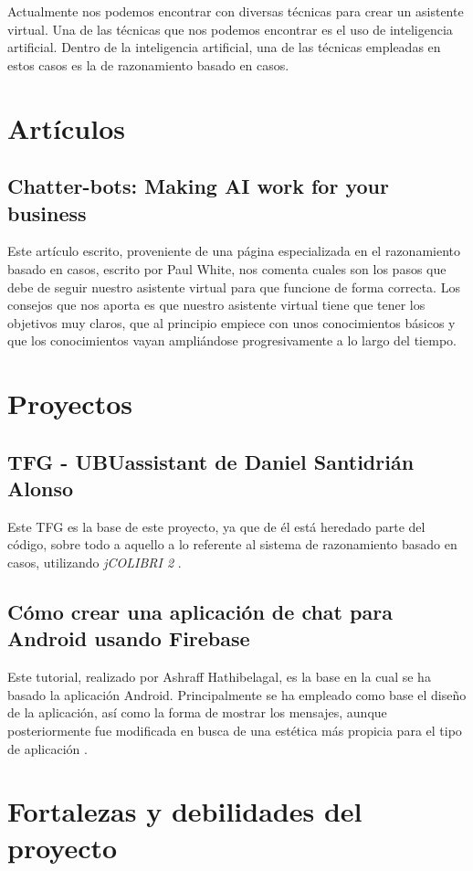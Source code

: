 
Actualmente nos podemos encontrar con diversas técnicas para crear un asistente virtual. Una de las técnicas que nos podemos encontrar es el uso de inteligencia artificial. Dentro de la inteligencia artificial, una de las técnicas empleadas en estos casos es la de razonamiento basado en casos.

\section{Artículos}
\subsection{Chatter-bots: Making AI work for your business}
Este artículo escrito, proveniente de una página especializada en el razonamiento basado en casos, escrito por Paul White, nos comenta cuales son los pasos que debe de seguir nuestro asistente virtual para que funcione de forma correcta. Los consejos que nos aporta es que nuestro asistente virtual tiene que tener los objetivos muy claros, que al principio empiece con unos conocimientos básicos y que los conocimientos vayan ampliándose progresivamente a lo largo del tiempo.

\section{Proyectos}
\subsection{TFG - UBUassistant de Daniel Santidrián Alonso}
Este TFG es la base de este proyecto, ya que de él está heredado parte del código, sobre todo a aquello a lo referente al sistema de razonamiento basado en casos, utilizando \emph{jCOLIBRI 2} \cite{tfg:git}.

\subsection{Cómo crear una aplicación de chat para Android usando Firebase}
Este tutorial, realizado por Ashraff Hathibelagal, es la base en la cual se ha basado la aplicación Android. Principalmente se ha empleado como base el diseño de la aplicación, así como la forma de mostrar los mensajes, aunque posteriormente fue modificada en busca de una estética más propicia para el tipo de aplicación \cite{chat:tut}.

\section{Fortalezas y debilidades del proyecto}
